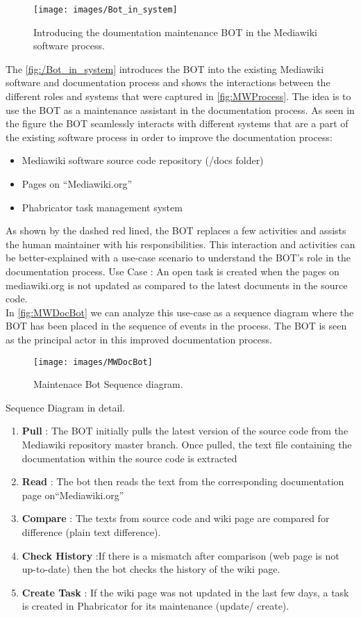 \begin{figure}[H]
  \centering
  \texttt{[image: images/Bot\_in\_system]}
  \caption[Introducing the doumentation maintenance BOT in the Mediawiki software process]{Introducing the doumentation maintenance BOT in the Mediawiki software process.}\label{fig:/Bot_in_system}
\end{figure}
The \autoref{fig:/Bot_in_system} introduces the BOT into the existing Mediawiki software and documentation process and shows the interactions between the different roles and systems that were captured in \autoref{fig:MWProcess}.
\indent The idea is to use the BOT as a maintenance assistant in the documentation process. As seen in the figure the BOT seamlessly interacts with different systems that are a part of the existing software process in order to improve the documentation process:
\begin{itemize}
\item Mediawiki software source code repository (/docs folder)
\item Pages on \enquote{Mediawiki.org}
\item Phabricator task management system
\end{itemize}
As shown by the dashed red lined, the BOT replaces a few activities and assists the human maintainer with his responsibilities.
This interaction and activities can be better-explained with a use-case scenario to understand the BOT's role in the documentation process. 
\indent Use Case : An open task is created when the pages on mediawiki.org is not updated as compared to the latest documents in the source code.
\\\indent  In \autoref{fig:MWDocBot} we can analyze this use-case as a sequence diagram where the BOT has been placed in the sequence of events in the process. The BOT is seen as the principal actor in this improved documentation process.
\begin{figure}[!htsb]
  \centering
  \texttt{[image: images/MWDocBot]}
  \caption[Maintenace Bot Sequence diagram]{Maintenace Bot Sequence diagram.}\label{fig:MWDocBot}
\end{figure}
Sequence Diagram in detail. 
\begin{enumerate}
\item \textbf{Pull} : The BOT initially pulls the latest version of the source code from the Mediawiki repository master branch. Once pulled, the text file containing the documentation within the source code is extracted
\item \textbf{Read} : The bot then reads the text from the corresponding documentation page on\enquote{Mediawiki.org}
\item \textbf{Compare} : The texts from source code and wiki page are compared for difference (plain text difference).
\item \textbf{Check History} :If there is a mismatch after comparison (web page is not up-to-date) then the bot checks the history of the wiki  page.
\item \textbf{Create Task} : If the wiki page was not updated in the last few days, a task is created in Phabricator for its maintenance (update/ create).
\end{enumerate}
